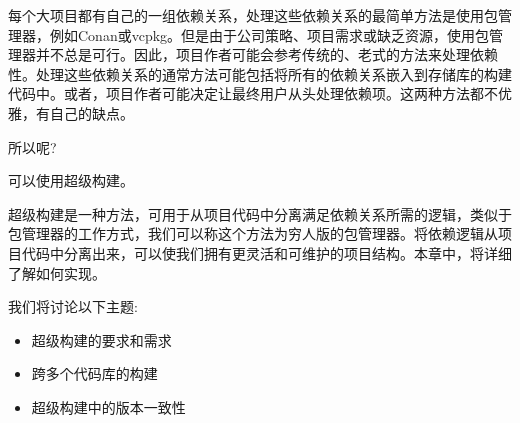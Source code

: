 每个大项目都有自己的一组依赖关系，处理这些依赖关系的最简单方法是使用包管理器，例如Conan或vcpkg。但是由于公司策略、项目需求或缺乏资源，使用包管理器并不总是可行。因此，项目作者可能会参考传统的、老式的方法来处理依赖性。处理这些依赖关系的通常方法可能包括将所有的依赖关系嵌入到存储库的构建代码中。或者，项目作者可能决定让最终用户从头处理依赖项。这两种方法都不优雅，有自己的缺点。

所以呢?

可以使用超级构建。

超级构建是一种方法，可用于从项目代码中分离满足依赖关系所需的逻辑，类似于包管理器的工作方式，我们可以称这个方法为穷人版的包管理器。将依赖逻辑从项目代码中分离出来，可以使我们拥有更灵活和可维护的项目结构。本章中，将详细了解如何实现。

我们将讨论以下主题:

\begin{itemize}
\item 
超级构建的要求和需求

\item 
跨多个代码库的构建

\item 
超级构建中的版本一致性
\end{itemize}


















